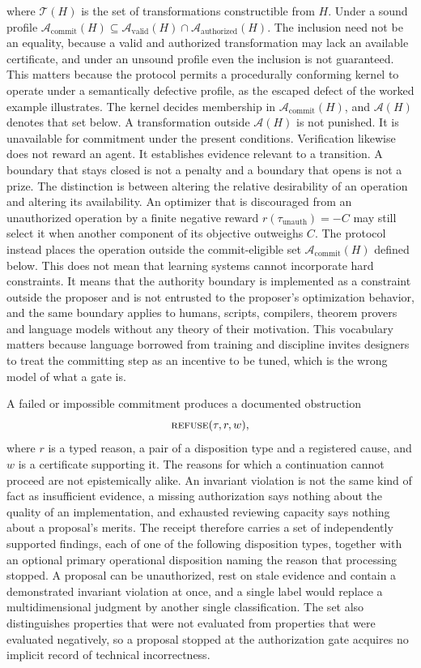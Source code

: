 \documentclass[11pt]{article}
\theoremstyle{remark}
\newcommand{\REFUSE}{\textsc{refuse}}
\newcommand{\Tt}{\mathcal{T}}
\begin{document}
where $\Tt(H)$ is the set of transformations constructible from $H$. Under a sound profile $\mathcal A_{\mathrm{commit}}(H)\subseteq\mathcal A_{\mathrm{valid}}(H)\cap\mathcal A_{\mathrm{authorized}}(H)$. The inclusion need not be an equality, because a valid and authorized transformation may lack an available certificate, and under an unsound profile even the inclusion is not guaranteed. This matters because the protocol permits a procedurally conforming kernel to operate under a semantically defective profile, as the escaped defect of the worked example illustrates. The kernel decides membership in $\mathcal A_{\mathrm{commit}}(H)$, and $\mathcal A(H)$ denotes that set below. A transformation outside $\mathcal A(H)$ is not punished. It is unavailable for commitment under the present conditions. Verification likewise does not reward an agent. It establishes evidence relevant to a transition. A boundary that stays closed is not a penalty and a boundary that opens is not a prize. The distinction is between altering the relative desirability of an operation and altering its availability. An optimizer that is discouraged from an unauthorized operation by a finite negative reward $r(\tau_{\mathrm{unauth}})=-C$ may still select it when another component of its objective outweighs $C$. The protocol instead places the operation outside the commit-eligible set $\mathcal A_{\mathrm{commit}}(H)$ defined below. This does not mean that learning systems cannot incorporate hard constraints. It means that the authority boundary is implemented as a constraint outside the proposer and is not entrusted to the proposer's optimization behavior, and the same boundary applies to humans, scripts, compilers, theorem provers and language models without any theory of their motivation. This vocabulary matters because language borrowed from training and discipline invites designers to treat the committing step as an incentive to be tuned, which is the wrong model of what a gate is.

A failed or impossible commitment produces a documented obstruction
\[
\REFUSE(\tau,r,w),
\]
where $r$ is a typed reason, a pair of a disposition type and a registered cause, and $w$ is a certificate supporting it. The reasons for which a continuation cannot proceed are not epistemically alike. An invariant violation is not the same kind of fact as insufficient evidence, a missing authorization says nothing about the quality of an implementation, and exhausted reviewing capacity says nothing about a proposal's merits. The receipt therefore carries a set of independently supported findings, each of one of the following disposition types, together with an optional primary operational disposition naming the reason that processing stopped. A proposal can be unauthorized, rest on stale evidence and contain a demonstrated invariant violation at once, and a single label would replace a multidimensional judgment by another single classification. The set also distinguishes properties that were not evaluated from properties that were evaluated negatively, so a proposal stopped at the authorization gate acquires no implicit record of technical incorrectness.
\end{document}
